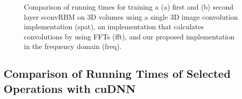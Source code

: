 \begin{figure}[t!]

\caption[Comparison of running times for training a sconvRBMs on 3D
images]{Comparison of running times for training a (a) first and (b) second
layer sconvRBM on 3D volumes using a single 3D image convolution implementation
(spat), an implementation that calculates convolutions by using FFTs (fft), and
our proposed implementation in the frequency domain (freq).}
\label{fig:run_oasis}
\end{figure}

\subsection{Comparison of Running Times of Selected Operations with cuDNN}

